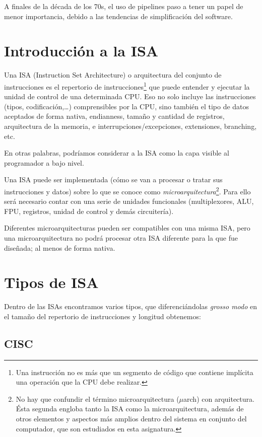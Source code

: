 \documentclass[a4paper, 11pt, titlepage]{article}
\begin{document}
    A finales de la década de los 70s, el uso de pipelines paso a tener un papel de menor importancia, debido a 
    las tendencias de simplificación del software.

\section{Introducción a la ISA}

    Una ISA (Instruction Set Architecture) o arquitectura del conjunto de instrucciones es el repertorio de 
    instrucciones\footnote{
        Una instrucción no es más que un segmento de código que contiene implícita una operación que la CPU debe 
        realizar.
    } que puede entender y ejecutar la unidad de control de una determinada CPU. Eso no solo 
    incluye las instrucciones (tipos, codificación,…) comprensibles por la CPU, sino también el tipo de 
    datos aceptados de forma nativa, endianness, tamaño y cantidad de registros, arquitectura de la memoria, 
    e interrupciones/excepciones, extensiones, branching, etc. 

    En otras palabras, podríamos considerar a la ISA como la capa visible al programador a bajo nivel.

    Una ISA puede ser implementada (cómo se van a procesar o tratar sus instrucciones y datos) sobre lo que se 
    conoce como \textit{microarquitectura}\footnote{
        No hay que confundir el término microarquitectura ($\mu$arch) con arquitectura. Ésta segunda engloba 
        tanto la ISA como la microarquitectura, además de otros elementos y aspectos más amplios dentro del 
        sistema en conjunto del computador, que son estudiados en esta asignatura.
    }. Para ello será necesario contar con una serie de unidades funcionales
    (multiplexores, ALU, FPU, registros, unidad de control y demás circuitería).

    Diferentes microarquitecturas pueden ser compatibles con una misma ISA, pero una microarquitectura no 
    podrá procesar otra ISA diferente para la que fue diseñada; al menos de forma nativa.

\section{Tipos de ISA}

    Dentro de las ISAs encontramos varios tipos, que diferenciándolas \textit{grosso modo} en el tamaño 
    del repertorio de instrucciones y longitud obtenemos:

    \subsection{CISC}
    
\end{document}
